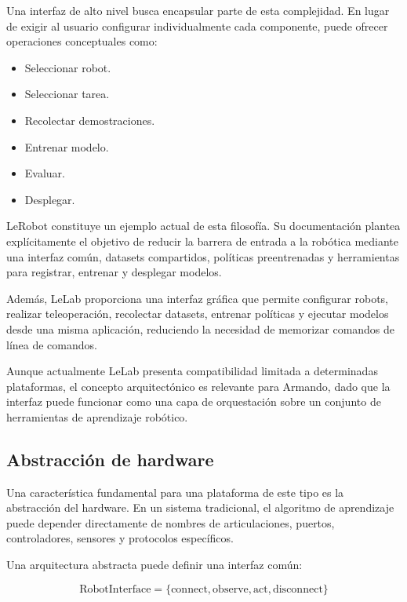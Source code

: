 \documentclass[stu,12pt,floatsintext]{apa7}
\begin{document}
Una interfaz de alto nivel busca encapsular parte de esta complejidad. En lugar de exigir al usuario configurar individualmente cada componente, puede ofrecer operaciones conceptuales como:

\begin{itemize}
    \item Seleccionar robot.
    \item Seleccionar tarea.
    \item Recolectar demostraciones.
    \item Entrenar modelo.
    \item Evaluar.
    \item Desplegar.
\end{itemize}

LeRobot constituye un ejemplo actual de esta filosofía. Su documentación plantea explícitamente el objetivo de reducir la barrera de entrada a la robótica mediante una interfaz común, datasets compartidos, políticas preentrenadas y herramientas para registrar, entrenar y desplegar modelos.

Además, LeLab proporciona una interfaz gráfica que permite configurar robots, realizar teleoperación, recolectar datasets, entrenar políticas y ejecutar modelos desde una misma aplicación, reduciendo la necesidad de memorizar comandos de línea de comandos.

Aunque actualmente LeLab presenta compatibilidad limitada a determinadas plataformas, el concepto arquitectónico es relevante para Armando, dado que la interfaz puede funcionar como una capa de orquestación sobre un conjunto de herramientas de aprendizaje robótico.

\subsection{Abstracción de hardware}

Una característica fundamental para una plataforma de este tipo es la abstracción del hardware. En un sistema tradicional, el algoritmo de aprendizaje puede depender directamente de nombres de articulaciones, puertos, controladores, sensores y protocolos específicos.

Una arquitectura abstracta puede definir una interfaz común:

\begin{equation}
\mathrm{RobotInterface}
=
\{
\mathrm{connect},
\mathrm{observe},
\mathrm{act},
\mathrm{disconnect}
\}
\end{equation}
\end{document}
